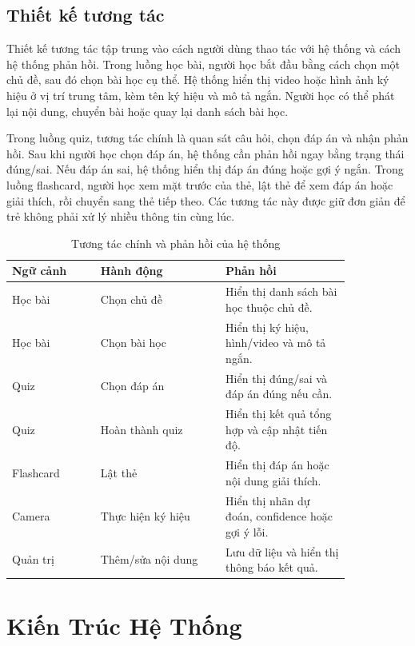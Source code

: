 \documentclass[conference]{IEEEtran}
\begin{document}
\subsection{Thiết kế tương tác}
Thiết kế tương tác tập trung vào cách người dùng thao tác với hệ thống và cách hệ thống phản hồi. Trong luồng học bài, người học bắt đầu bằng cách chọn một chủ đề, sau đó chọn bài học cụ thể. Hệ thống hiển thị video hoặc hình ảnh ký hiệu ở vị trí trung tâm, kèm tên ký hiệu và mô tả ngắn. Người học có thể phát lại nội dung, chuyển bài hoặc quay lại danh sách bài học.

Trong luồng quiz, tương tác chính là quan sát câu hỏi, chọn đáp án và nhận phản hồi. Sau khi người học chọn đáp án, hệ thống cần phản hồi ngay bằng trạng thái đúng/sai. Nếu đáp án sai, hệ thống hiển thị đáp án đúng hoặc gợi ý ngắn. Trong luồng flashcard, người học xem mặt trước của thẻ, lật thẻ để xem đáp án hoặc giải thích, rồi chuyển sang thẻ tiếp theo. Các tương tác này được giữ đơn giản để trẻ không phải xử lý nhiều thông tin cùng lúc.

\begin{table}[htbp]
\caption{Tương tác chính và phản hồi của hệ thống}
\begin{center}
\footnotesize
\begin{tabular}{|p{0.22\linewidth}|p{0.31\linewidth}|p{0.31\linewidth}|}
\hline
\textbf{Ngữ cảnh} & \textbf{Hành động} & \textbf{Phản hồi} \\
\hline
Học bài & Chọn chủ đề & Hiển thị danh sách bài học thuộc chủ đề. \\
\hline
Học bài & Chọn bài học & Hiển thị ký hiệu, hình/video và mô tả ngắn. \\
\hline
Quiz & Chọn đáp án & Hiển thị đúng/sai và đáp án đúng nếu cần. \\
\hline
Quiz & Hoàn thành quiz & Hiển thị kết quả tổng hợp và cập nhật tiến độ. \\
\hline
Flashcard & Lật thẻ & Hiển thị đáp án hoặc nội dung giải thích. \\
\hline
Camera & Thực hiện ký hiệu & Hiển thị nhãn dự đoán, confidence hoặc gợi ý lỗi. \\
\hline
Quản trị & Thêm/sửa nội dung & Lưu dữ liệu và hiển thị thông báo kết quả. \\
\hline
\end{tabular}
\label{tab:interactions}
\end{center}
\end{table}

\section{Kiến Trúc Hệ Thống}
\end{document}
